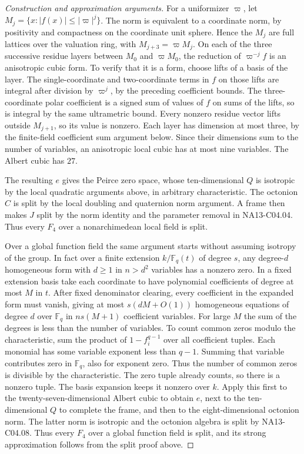 \documentclass[11pt,a4paper,openany,oneside]{book}
\theoremstyle{resultstyle}
\theoremstyle{definition}
\numberwithin{equation}{chapter}
\begin{document}
\begin{proof}[Construction and approximation arguments]
For a uniformizer \(\varpi\), let
\(M_j=\{x:|f(x)|\leq|\varpi|^j\}\).
The norm is equivalent to a coordinate norm,
by positivity and compactness on the coordinate
unit sphere. Hence the \(M_j\) are full
lattices over the valuation ring, with
\(M_{j+3}=\varpi M_j\).
On each of the three successive residue layers
between \(M_0\) and \(\varpi M_0\), the
reduction of \(\varpi^{-j} f\) is an
anisotropic cubic form. To verify that it is a
form, choose lifts of a basis of the layer.
The single-coordinate and two-coordinate terms
in \(f\) on those lifts are integral after
division by \(\varpi^j\), by the preceding
coefficient bounds. The three-coordinate
polar coefficient is a signed sum of values
of \(f\) on sums of the lifts, so is integral
by the same ultrametric bound. Every nonzero
residue vector lifts outside \(M_{j+1}\),
so its value is nonzero. Each layer has
dimension at most three, by the finite-field
coefficient sum argument below. Since their
dimensions sum to the number of variables,
an anisotropic local cubic has at most nine
variables. The Albert cubic has \(27\).

The resulting \(e\) gives the Peirce zero
space, whose ten-dimensional \(Q\) is isotropic
by the local quadratic arguments
above, in arbitrary characteristic.
The octonion \(C\) is split by the
local doubling and quaternion norm
argument. A frame then makes \(J\)
split by the norm identity and the
parameter removal in NA13-C04.04.
Thus every \(F_4\) over a
nonarchimedean local field is split.

Over a global function field the
same argument starts without assuming
isotropy of the group. In fact over
a finite extension \(k/\mathbb F_q(t)\)
of degree \(s\), any degree-\(d\)
homogeneous form with \(d\ge 1\) in \(n>d^2\)
variables has a nonzero zero. In a
fixed extension basis take each
coordinate to have polynomial
coefficients of degree at most \(M\)
in \(t\). After fixed denominator
clearing, every coefficient in the
expanded form must vanish, giving
at most \(s(dM+O(1))\) homogeneous
equations of degree \(d\) over
\(\mathbb F_q\) in \(ns(M+1)\)
coefficient variables. For large
\(M\) the sum of the degrees is
less than the number of variables.
To count common zeros modulo the
characteristic, sum the product
of \(1-f_i^{q-1}\) over all coefficient
tuples. Each monomial has some
variable exponent less than \(q-1\).
Summing that variable contributes
zero in \(\mathbb F_q\), also for
exponent zero. Thus the number of
common zeros is divisible by the
characteristic. The zero tuple
already counts, so there is a
nonzero tuple. The basis expansion
keeps it nonzero over \(k\).
Apply this first to the
twenty-seven-dimensional Albert
cubic to obtain \(e\), next to the
ten-dimensional \(Q\) to complete
the frame, and then to the
eight-dimensional octonion norm.
The latter norm is isotropic and
the octonion algebra is split by
NA13-C04.08. Thus every \(F_4\)
over a global function field is
split, and its strong approximation
follows from the split proof above.


\end{proof}
\end{document}
